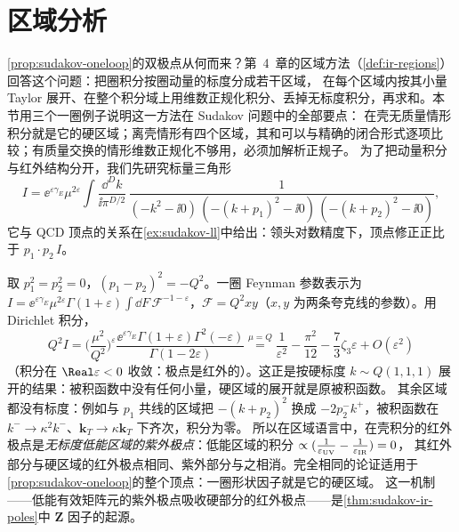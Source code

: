 \section{区域分析}\label{sec:sudakov-regions}

\cref{prop:sudakov-oneloop}的双极点从何而来？第~4~章的区域方法（\cref{def:ir-regions}）回答这个问题：把圈积分按圈动量的标度分成若干区域，
在每个区域内按其小量 Taylor 展开、在整个积分域上用维数正规化积分、丢掉无标度积分，再求和。本节用三个一圈例子说明这一方法在 Sudakov 问题中的全部要点：
在壳无质量情形积分就是它的硬区域；离壳情形有四个区域，其和可以与精确的闭合形式逐项比较；有质量交换的情形维数正规化不够用，必须加解析正规子。
为了把动量积分与红外结构分开，我们先研究标量三角形
\begin{equation}\label{eq:sudakov-triangle}
I=\ee^{\varepsilon\gamma_E}\mu^{2\varepsilon}\int\!\frac{\dd^Dk}{\ii\pi^{D/2}}\,
\frac{1}{(-k^2-\ii0)\,(-(k+p_1)^2-\ii0)\,(-(k+p_2)^2-\ii0)},
\end{equation}
它与 QCD 顶点的关系在\cref{ex:sudakov-ll}中给出：领头对数精度下，顶点修正正比于 $p_1\cdot p_2\,I$。

\begin{example}[在壳无质量形状因子 = 硬区]\label{ex:sudakov-onshell-hard}
取 $p_1^2=p_2^2=0$，$(p_1-p_2)^2=-Q^2$。一圈 Feynman 参数表示为
$I=\ee^{\varepsilon\gamma_E}\mu^{2\varepsilon}\Gamma(1+\varepsilon)\int\!\dd F\,\mathcal F^{-1-\varepsilon}$，$\mathcal F=Q^2x y$（$x,y$ 为两条夸克线的参数）。用 Dirichlet 积分，
\begin{equation}\label{eq:sudakov-onshell-H}
Q^2I=\Big(\frac{\mu^2}{Q^2}\Big)^{\varepsilon}\frac{\ee^{\varepsilon\gamma_E}\Gamma(1+\varepsilon)\Gamma^2(-\varepsilon)}{\Gamma(1-2\varepsilon)}
\overset{\mu=Q}{=}\frac1{\varepsilon^2}-\frac{\pi^2}{12}-\frac73\zeta_3\varepsilon+O(\varepsilon^2)
\end{equation}
（积分在 $\Real\varepsilon<0$ 收敛：极点是红外的）。这正是按硬标度 $k\sim Q(1,1,1)$ 展开的结果：被积函数中没有任何小量，硬区域的展开就是原被积函数。
其余区域都没有标度：例如与 $p_1$ 共线的区域把 $-(k+p_2)^2$ 换成 $-2p_2^-k^+$，被积函数在 $k^-\to\kappa^2k^-$、$\mathbf k_T\to\kappa\mathbf k_T$ 下齐次，积分为零。
所以在区域语言中，在壳积分的红外极点是\emph{无标度低能区域的紫外极点}：低能区域的积分 $\propto(\frac1{\varepsilon_{\rm UV}}-\frac1{\varepsilon_{\rm IR}})=0$，
其红外部分与硬区域的红外极点相同、紫外部分与之相消。完全相同的论证适用于\cref{prop:sudakov-oneloop}的整个顶点：一圈形状因子就是它的硬区域。
这一机制——低能有效矩阵元的紫外极点吸收硬部分的红外极点——是\cref{thm:sudakov-ir-poles}中 $\mathbf Z$ 因子的起源。
\end{example}

